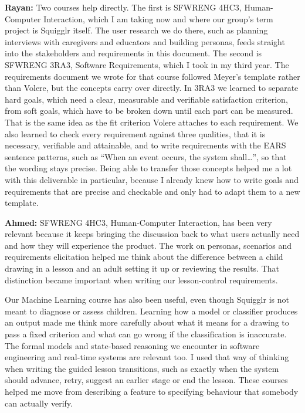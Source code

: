 \documentclass[12pt]{article}
\renewcommand{\_}{\textunderscore\allowbreak}%
\begin{document}
\begin{enumerate}
\textbf{Rayan:} Two courses help directly. The first is SFWRENG 4HC3,
Human-Computer Interaction, which I am taking now and where our group's term
project is Squigglr itself. The user research we do there, such as planning
interviews with caregivers and educators and building personas, feeds straight
into the stakeholders and requirements in this document. The second is SFWRENG
3RA3, Software Requirements, which I took in my third year. The requirements
document we wrote for that course followed Meyer's template rather than Volere,
but the concepts carry over directly. In 3RA3 we learned to separate hard goals,
which need a clear, measurable and verifiable satisfaction criterion, from soft
goals, which have to be broken down until each part can be measured. That is the
same idea as the fit criterion Volere attaches to each requirement. We also
learned to check every requirement against three qualities, that it is
necessary, verifiable and attainable, and to write requirements with the EARS
sentence patterns, such as ``When an event occurs, the system shall\ldots'', so
that the wording stays precise. Being able to transfer those concepts helped me
a lot with this deliverable in particular, because I already knew how to write
goals and requirements that are precise and checkable and only had to adapt them
to a new template.

\textbf{Ahmed:} SFWRENG 4HC3, Human-Computer Interaction, has been very relevant
because it keeps bringing the discussion back to what users actually need and
how they will experience the product. The work on personas, scenarios and
requirements elicitation helped me think about the difference between a child
drawing in a lesson and an adult setting it up or reviewing the results. That
distinction became important when writing our lesson-control requirements.

Our Machine Learning course has also been useful, even though Squigglr is not
meant to diagnose or assess children. Learning how a model or classifier
produces an output made me think more carefully about what it means for a
drawing to pass a fixed criterion and what can go wrong if the classification is
inaccurate. The formal models and state-based reasoning we encounter in software
engineering and real-time systems are relevant too. I used that way of thinking
when writing the guided lesson transitions, such as exactly when the system
should advance, retry, suggest an earlier stage or end the lesson. These courses
helped me move from describing a feature to specifying behaviour that somebody
can actually verify.


\end{enumerate}
\end{document}

